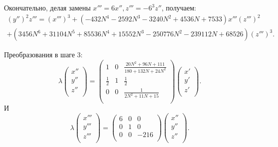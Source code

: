 \documentclass[a4paper,12pt]{article}
\theoremstyle{definition}
\begin{document}
\begin{itemize}[leftmargin=0.6cm]
        Окончательно, делая замены \(x''' = 6 x'', z''' = -6^3 z''\), получаем:
        \begin{multline*}
            \left( y'' \right)^2 z''' = \left( x''' \right)^3  +  \left(-432 N^4
            - 2592 N^3 - 3240 N^2 + 4536 N + 7533\right) x''' \left( z'''
            \right)^2 \\ 
            +  \left(3456 N^6 + 31104 N^5 + 85536 N^4 + 15552 N^3 -
            250776 N^2 - 239112 N + 68526 \right) \left( z''' \right)^3
        .\end{multline*}

        Преобразования в шаге 3:
        \[
        \lambda \begin{pmatrix}
            x'' \\
            y'' \\
            z'' \\
        \end{pmatrix} = 
        \begin{pmatrix}
            1 & 0 & \frac{20 N^2 + 96 N + 111}{180 + 132 N + 24 N^2} \\
            \frac{1}{2} & 1 & \frac{1}{2} \\
            0 & 0 & \frac{1}{2 N^2 + 11 N + 15} \\
        \end{pmatrix}
        \begin{pmatrix}
            x' \\
            y' \\
            z' \\
        \end{pmatrix}
        .\] 
        И
        \[
        \lambda \begin{pmatrix}
            x''' \\
            y''' \\
            z''' \\
        \end{pmatrix} = 
        \begin{pmatrix}
            6 & 0 & 0 \\
            0 & 1 & 0 \\
            0 & 0 & -216 \\
        \end{pmatrix}
        \begin{pmatrix}
            x'' \\
            y'' \\
            z'' \\
        \end{pmatrix}
        .\] 
    \end{itemize}
\end{document}
